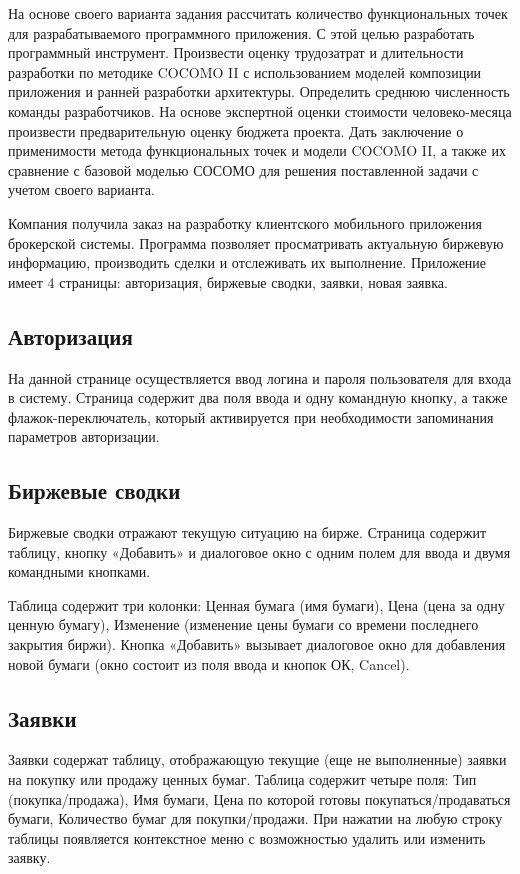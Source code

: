 На основе своего варианта задания рассчитать количество функциональных точек для разрабатываемого программного приложения. 
С этой целью разработать программный инструмент.
Произвести оценку трудозатрат и длительности разработки по методике COCOMO II с использованием моделей композиции приложения и ранней разработки архитектуры.
Определить среднюю численность команды разработчиков.
На основе экспертной оценки стоимости человеко-месяца произвести предварительную оценку бюджета проекта.
Дать заключение о применимости метода функциональных точек и модели COCOMO II, а также их сравнение с базовой моделью СОСОМО для решения поставленной задачи с учетом своего варианта.


Компания получила заказ на разработку клиентского мобильного приложения брокерской системы. 
Программа позволяет просматривать актуальную биржевую информацию, производить сделки и отслеживать их выполнение.
Приложение имеет 4 страницы: авторизация, биржевые сводки, заявки, новая заявка.

\subsection*{Авторизация}
На данной странице осуществляется ввод логина и пароля пользователя для входа в систему.
Страница содержит два поля ввода и одну командную кнопку, а также флажок-переключатель, который активируется при необходимости запоминания параметров авторизации.

\subsection*{Биржевые сводки}
Биржевые сводки отражают текущую ситуацию на бирже. 
Страница содержит таблицу, кнопку «Добавить» и диалоговое окно с одним полем для ввода и двумя командными кнопками.

Таблица содержит три колонки: Ценная бумага (имя бумаги), Цена (цена за одну ценную бумагу), Изменение (изменение цены бумаги со времени последнего закрытия биржи). 
Кнопка «Добавить» вызывает диалоговое окно для добавления новой бумаги (окно состоит из поля ввода и кнопок ОК, Cancel).

\subsection*{Заявки}
Заявки содержат таблицу, отображающую текущие (еще не выполненные) заявки на покупку или продажу ценных бумаг.
Таблица содержит четыре поля: Тип (покупка/продажа), Имя бумаги, Цена по которой готовы покупаться/продаваться бумаги, Количество бумаг для покупки/продажи.
При нажатии на любую строку таблицы появляется контекстное меню с возможностью удалить или изменить заявку.

